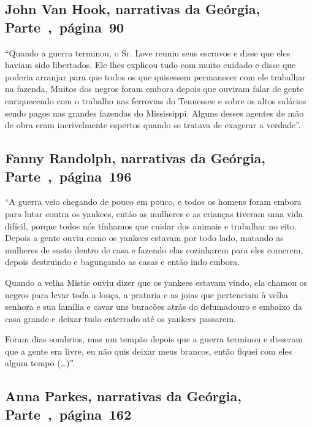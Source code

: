 \subsection{John Van Hook, narrativas da Geórgia, Parte~,~página~90}
\label{ref265}

``Quando a guerra terminou, o Sr. Love reuniu seus escravos e disse que
eles haviam sido libertados. Ele lhes explicou tudo com muito cuidado e
disse que poderia arranjar para que todos os que quisessem permanecer
com ele trabalhar na fazenda. Muitos dos negros foram embora depois que
ouviram falar de gente enriquecendo com o trabalho nas ferrovias do
Tennessee e sobre os altos salários sendo pagos nas grandes fazendas do
Mississippi. Alguns desses agentes de mão de obra eram incrivelmente
espertos quando se tratava de exagerar a verdade''.

\subsection{Fanny Randolph, narrativas da Geórgia, Parte~,~página~196}
\label{ref221}

``A guerra veio chegando de pouco em pouco, e todos os homens foram
embora para lutar contra os yankees, então as mulheres e as crianças
tiveram uma vida difícil, porque todos nós tínhamos que cuidar dos
animais e trabalhar no eito. Depois a gente ouviu como os yankees
estavam por todo lado, matando as mulheres de susto dentro de casa e
fazendo elas cozinharem para eles comerem, depois destruindo e
bagunçando as casas e então indo embora.

Quando a velha Mistie ouviu dizer que os yankees estavam vindo, ela
chamou os negros para levar toda a louça, a prataria e as joias que
pertenciam à velha senhora e sua família e cavar uns buracões atrás do
defumadouro e embaixo da casa grande e deixar tudo enterrado até os
yankees passarem.

Foram dias sombrios, mas um tempão depois que a guerra terminou e
disseram que a gente era livre, eu não quis deixar meus brancos, então
fiquei com eles algum tempo (\ldots{})''.

\subsection{Anna Parkes, narrativas da Geórgia, Parte~,~página~162}
\label{ref209}

